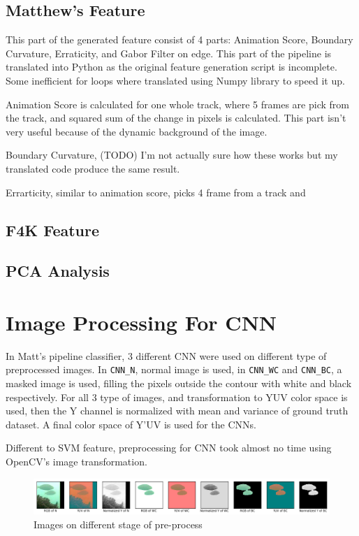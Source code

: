 \documentclass[bsc,logo,twoside,fullspacing,parskip]{infthesis}
\begin{document}
\subsection{Matthew's Feature}

This part of the generated feature consist of 4 parts: Animation Score, Boundary Curvature, Erraticity, and Gabor Filter on edge. This part of the pipeline is translated into Python as the original feature generation script is incomplete. Some inefficient for loops where translated using Numpy library to speed it up.

Animation Score is calculated for one whole track, where 5 frames are pick from the track, and squared sum of the change in pixels is calculated. This part isn't very useful because of the dynamic background of the image.

Boundary Curvature, (TODO) I'm not actually sure how these works but my translated code produce the same result.

Errarticity, similar to animation score, picks 4 frame from a track and

\subsection{F4K Feature}

\subsection{PCA Analysis}

\section{Image Processing For CNN}

In Matt's pipeline classifier, 3 different CNN were used on different type of preprocessed images.
In  {\tt CNN\_N}, normal image is used, in {\tt CNN\_WC} and {\tt CNN\_BC}, a masked image is used, filling the pixels outside the contour with white and black respectively.
For all 3 type of images, and transformation to YUV color space is used, then the Y channel is normalized with mean and variance of ground truth dataset.
A final color space of Y'UV is used for the CNNs.


Different to SVM feature, preprocessing for CNN took almost no time using OpenCV's image transformation.

\begin{figure}[!b]
\centering
    \includegraphics[scale=0.4]{graph/imagepre.png}
    \caption{Images on different stage of pre-process}
    \label{fig:imageprepro}
\end{figure}
\end{document}
